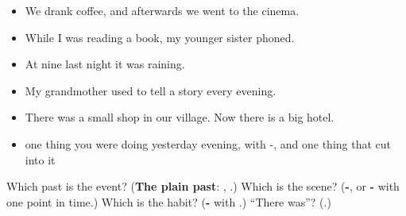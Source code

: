 \begin{itemize}
\raggedright
  \item We drank coffee, and afterwards we went to the cinema.
  \item While I was reading a book, my younger sister phoned.
  \item At nine last night it was raining.
  \item My grandmother used to tell a story every evening.
  \item There was a small shop in our village. Now there is a big hotel.
  \item one thing you were doing yesterday evening, with -, and one thing that cut into it
\end{itemize}

\begin{tcolorbox}[breakable,colback=teal!4,colframe=teal!35!black,title={Before you move on}]
Which past is the event? (\textbf{The plain past}: \textbf{}, \textbf{}.) Which is the scene? (\textbf{-}, or \textbf{-} with one point in time.) Which is the habit? (\textbf{-} with \textbf{}.) \textquotedblleft{}There was\textquotedblright{}? (\textbf{}.)
\end{tcolorbox}
